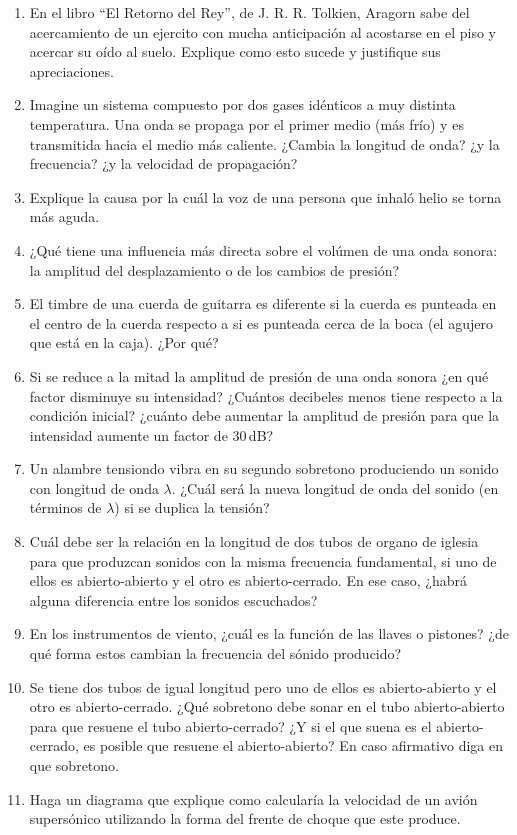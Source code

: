 \documentclass[a4paper,12pt]{article}
\begin{document}
\begin{enumerate}
	\item En el libro ``El Retorno del Rey'', de J. R. R. Tolkien,
		Aragorn sabe del acercamiento de un ejercito con mucha
		anticipación al acostarse en
		el piso y acercar su oído al suelo. Explique como esto sucede y
		justifique sus apreciaciones. 
	\item Imagine un sistema compuesto por dos gases idénticos a muy
		distinta temperatura. Una onda se propaga por el primer medio
		(más frío) y es transmitida hacia el medio más caliente.
		¿Cambia la longitud de onda?  ¿y la frecuencia? ¿y la velocidad
		de propagación?
	\item Explique la causa por la cuál la voz de una persona que
		inhaló helio se torna más aguda.
	\item ¿Qué tiene una influencia más directa sobre el volúmen de una
		onda sonora: la amplitud del desplazamiento o de los cambios de
		presión?
	\item El timbre de una cuerda de guitarra es diferente si la cuerda
		es punteada en el centro de la cuerda respecto a si es punteada
		cerca de la boca (el agujero que está en la caja). ¿Por qué?
	\item Si se reduce a la mitad la amplitud de presión de una onda
		sonora ¿en qué factor disminuye su intensidad? ¿Cuántos
		decibeles menos tiene respecto a la condición inicial? ¿cuánto
		debe aumentar la amplitud de presión para que la intensidad
		aumente un factor de $30$\,dB?
	\item Un alambre tensiondo vibra en su segundo sobretono
		produciendo un sonido con longitud de onda $\lambda$. ¿Cuál
		será la nueva longitud de onda del sonido (en términos de
		$\lambda$) si se duplica la tensión?
	\item Cuál debe ser la relación en la longitud de dos tubos de
		organo de iglesia para que produzcan sonidos con la misma
		frecuencia fundamental, si uno de ellos es abierto-abierto y el
		otro es abierto-cerrado. En ese caso, ¿habrá alguna diferencia
		entre los sonidos escuchados?
	\item En los instrumentos de viento, ¿cuál es la función de las
		llaves o pistones? ¿de qué forma estos cambian la frecuencia
		del sónido producido?
	\item Se tiene dos tubos de igual longitud pero uno de ellos es
		abierto-abierto y el otro es abierto-cerrado. ¿Qué sobretono
		debe sonar en el tubo abierto-abierto para que resuene el tubo
		abierto-cerrado? ¿Y si el que suena es el abierto-cerrado, es
		posible que resuene el abierto-abierto? En caso afirmativo diga
		en que sobretono.
	\item Haga un diagrama que explique como calcularía la velocidad de
		un avión supersónico utilizando la forma del frente de choque
		que este produce. 
\end{enumerate}
\end{document}
